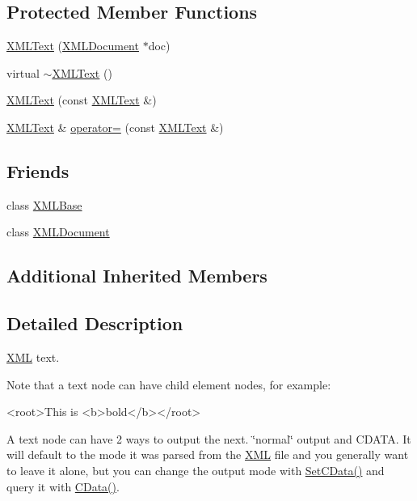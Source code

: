 \subsection*{Protected Member Functions}
\begin{DoxyCompactItemize}
\item 
\hyperlink{classtinyxml2_1_1_x_m_l_text_ad9f46d70e61e5386ead93728d8b90267}{X\-M\-L\-Text} (\hyperlink{classtinyxml2_1_1_x_m_l_document}{X\-M\-L\-Document} $\ast$doc)
\item 
virtual \hyperlink{classtinyxml2_1_1_x_m_l_text_ae9b8790d0dc13914394dbd7437c0e59d}{$\sim$\-X\-M\-L\-Text} ()
\item 
\hyperlink{classtinyxml2_1_1_x_m_l_text_a002156e1f61ee6d48e5368b7cca25582}{X\-M\-L\-Text} (const \hyperlink{classtinyxml2_1_1_x_m_l_text}{X\-M\-L\-Text} \&)
\item 
\hyperlink{classtinyxml2_1_1_x_m_l_text}{X\-M\-L\-Text} \& \hyperlink{classtinyxml2_1_1_x_m_l_text_ad8c9f398d92fa472e213b89d8483ae8f}{operator=} (const \hyperlink{classtinyxml2_1_1_x_m_l_text}{X\-M\-L\-Text} \&)
\end{DoxyCompactItemize}
\subsection*{Friends}
\begin{DoxyCompactItemize}
\item 
class \hyperlink{classtinyxml2_1_1_x_m_l_text_a449202cfc89e7ae5c2f81995476f9ec1}{X\-M\-L\-Base}
\item 
class \hyperlink{classtinyxml2_1_1_x_m_l_text_a4eee3bda60c60a30e4e8cd4ea91c4c6e}{X\-M\-L\-Document}
\end{DoxyCompactItemize}
\subsection*{Additional Inherited Members}


\subsection{Detailed Description}
\hyperlink{namespace_x_m_l}{X\-M\-L} text.

Note that a text node can have child element nodes, for example\-: \begin{DoxyVerb}<root>This is <b>bold</b></root>
\end{DoxyVerb}


A text node can have 2 ways to output the next. \char`\"{}normal\char`\"{} output and C\-D\-A\-T\-A. It will default to the mode it was parsed from the \hyperlink{namespace_x_m_l}{X\-M\-L} file and you generally want to leave it alone, but you can change the output mode with \hyperlink{classtinyxml2_1_1_x_m_l_text_ad080357d76ab7cc59d7651249949329d}{Set\-C\-Data()} and query it with \hyperlink{classtinyxml2_1_1_x_m_l_text_a125574fe49da80efbae1349f20d02d41}{C\-Data()}. 

